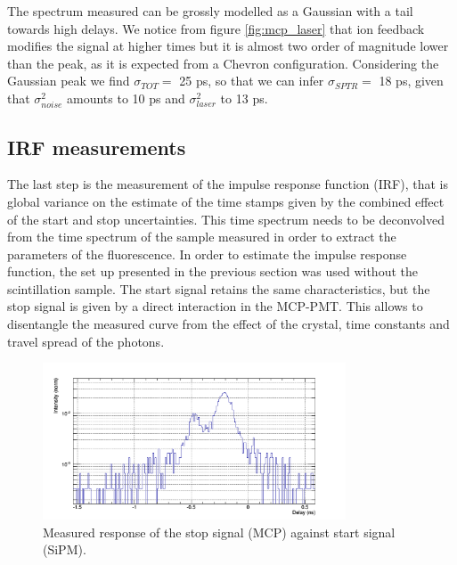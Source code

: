 The spectrum measured can be grossly modelled as a Gaussian with a tail towards high delays. 
We notice from figure \ref{fig:mcp_laser} that ion feedback modifies the signal at higher times but it is almost two order of magnitude lower than the peak, as it is expected from a Chevron configuration. Considering the Gaussian peak we find $\sigma _{TOT} =$ 25 ps, so that we can infer    $\sigma _{SPTR} = $ 18 ps, given that $\sigma _{noise}^{2}$ amounts to 10 ps and $\sigma _{laser}^{2}$ to 13 ps.

\subsection{IRF measurements}
The last step is the measurement of the impulse response function (IRF), that is global variance on the estimate of the time stamps given by the combined effect of the start and stop uncertainties. This time spectrum needs to be deconvolved from the time spectrum of the sample measured in order to extract the parameters of the fluorescence.
In order to estimate the impulse response function, the set up presented in the previous section was used without the scintillation sample. The start signal retains the same characteristics, but the stop signal is given by a direct interaction in the MCP-PMT. This allows to disentangle the measured curve from the effect of the crystal, time constants and travel spread of the photons.
\begin{figure}[htbp]
\begin{center}
\includegraphics[width=9cm, heigth=6cm]{../Pictures/Chapter_8/response_cer_10}
\end{center}
\caption[Corrected IRF]{Measured response of the stop signal (MCP) against start signal (SiPM).}
\label{fig:ceren_10}
\end{figure}


